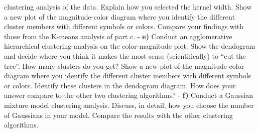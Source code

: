 \documentclass[11pt]{article}
\begin{document}
clustering analysis of the data. Explain how you selected the kernel
width. Show a new plot of the magnitude-color diagram where you identify
the different cluster members with different symbols or colors. Compare
your findings with those from the K-means analysis of part c. -
\textbf{e)} Conduct an agglomerative hierarchical clustering analysis on
the color-magnitude plot. Show the dendogram and decide where you think
it makes the most sense (scientifically) to ``cut the tree''. How many
clusters do you get? Show a new plot of the magnitude-color diagram
where you identify the different cluster members with different symbols
or colors. Identify these clusters in the dendogram diagram. How does
your answer compare to the other two clustering algorithms? -
\textbf{f)} Conduct a Gaussian mixture model clustering analysis.
Discuss, in detail, how you choose the number of Gaussians in your
model. Compare the results with the other clustering algorithms.
\end{document}
